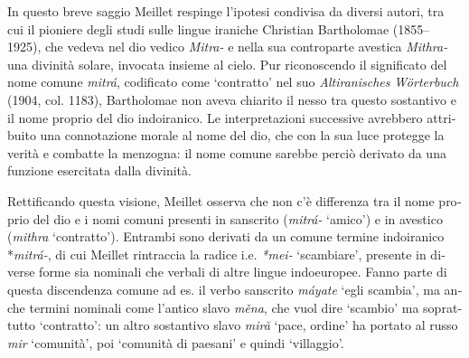 \documentclass[output=paper]{../langscibook}
\begin{document}
\begin{otherlanguage}{italian}
In questo breve saggio Meillet respinge l’ipotesi condivisa da diversi autori, tra cui il pioniere degli studi sulle lingue iraniche Christian Bartholomae (1855--1925), che vedeva nel dio vedico \textit{Mitra-} e nella sua controparte avestica \textit{Mithra-} una divinità solare, invocata insieme al cielo.\textbf{ }Pur riconoscendo il significato del nome comune \textit{mitrá}, codificato come ‘contratto’ nel suo \textit{Altiranisches} \textit{Wörterbuch} (1904, col. 1183), Bartholomae non aveva chiarito il nesso tra questo sostantivo e il nome proprio del dio indoiranico. Le interpretazioni successive avrebbero attribuito una connotazione morale al nome del dio, che con la sua luce protegge la verità e combatte la menzogna: il nome comune sarebbe perciò derivato da una funzione esercitata dalla divinità.\footnotemark{}

Rettificando questa visione, Meillet osserva che non c’è differenza tra il nome proprio del dio e i nomi comuni presenti in sanscrito (\textit{mitrá{}-} ‘amico’) e in avestico (\textit{mithra} ‘contratto’). Entrambi sono derivati da un comune termine indoiranico *\textit{mitrá-}, di cui Meillet rintraccia la radice i.e. \textit{*mei-} ‘scambiare’, presente in diverse forme sia nominali che verbali di altre lingue indoeuropee.\footnotemark{} Fanno parte di questa discendenza comune ad es. il verbo sanscrito \textit{máyate} ‘egli scambia’, ma anche termini nominali come l’antico slavo \textit{měna}, che vuol dire ‘scambio’ ma soprattutto ‘contratto’: un altro sostantivo slavo \textit{miră} ‘pace, ordine’ ha portato al russo \textit{mir} ‘comunità’, poi ‘comunità di paesani’ e quindi ‘villaggio’.



\end{otherlanguage}
\end{document}
